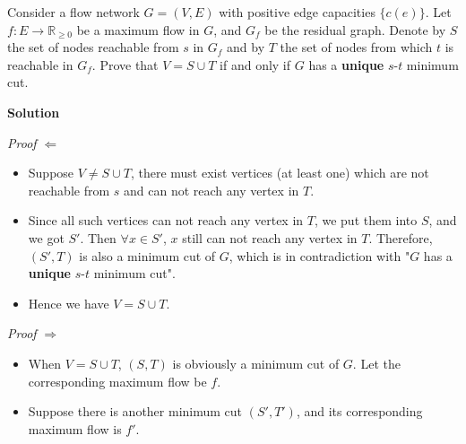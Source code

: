 \documentclass{article}
\newcounter{exercise}
\newcommand{\<}{
    \langle}
\renewcommand{\>}{
    \rangle}
\begin{document}
{\newpage

\begin{exercise}
Consider a flow network $G=(V,E)$ with positive edge capacities $\{c(e)\}$. Let $f:E\rightarrow \mathbb{R}_{\geq 0}$ be a maximum flow in $G$, and $G_f$ be the residual graph. Denote by $S$ the set of nodes reachable from $s$ in $G_f$ and by $T$ the set of nodes from which $t$ is reachable in $G_f$.  Prove that $V=S\cup T$ if and only if $G$ has a \textbf{unique} $s$-$t$ minimum cut.
\end{exercise}

\bigskip \noindent \textbf{Solution} \bigskip

\noindent \textit{Proof} $\Leftarrow$
\begin{itemize}
    \item Suppose $V \ne S \cup T$, there must exist vertices (at least one) which are not reachable from $s$ and can not reach any vertex in $T$.
    \item Since all such vertices can not reach any vertex in $T$, we put them into $S$, and we got $S'$. Then $\forall{x \in S'}$, $x$ still can not reach any vertex in $T$. Therefore, $(S', T)$ is also a minimum cut of $G$, which is in contradiction with "$G$ has a \textbf{unique} $s$-$t$ minimum cut".
    \item Hence we have $V = S \cup T$.
\end{itemize}


\bigskip

\noindent \textit{Proof} $\Rightarrow$
\begin{itemize}
    \item When $V = S \cup T$, $(S, T)$ is obviously a minimum cut of $G$. Let the corresponding maximum flow be $f$.
    \item Suppose there is another minimum cut $(S', T')$, and its corresponding maximum flow is $f'$.
\end{itemize}

}
\end{document}
